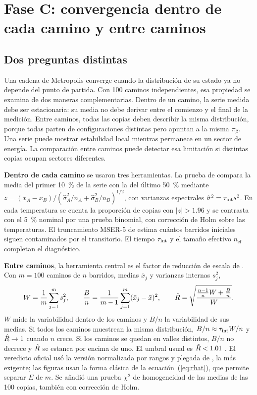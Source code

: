 \section{Fase C: convergencia dentro de cada camino y entre caminos}
\label{sec:convergencia}

\subsection{Dos preguntas distintas}

Una cadena de Metropolis converge cuando la distribución de su estado ya no depende del punto de partida. Con 100 caminos independientes, esa propiedad se examina de dos maneras complementarias. Dentro de un camino, la serie medida debe ser estacionaria: su media no debe derivar entre el comienzo y el final de la medición. Entre caminos, todas las copias deben describir la misma distribución, porque todas parten de configuraciones distintas pero apuntan a la misma $\pi_\beta$. Una serie puede mostrar estabilidad local mientras permanece en un sector de energía. La comparación entre caminos puede detectar esa limitación si distintas copias ocupan sectores diferentes.

\textbf{Dentro de cada camino} se usaron tres herramientas. La prueba de \citet{geweke1992} compara la media del primer 10~\% de la serie con la del último 50~\% mediante $z=(\bar x_A-\bar x_B)/(\hat\sigma_A^2/n_A+\hat\sigma_B^2/n_B)^{1/2}$, con varianzas espectrales $\hat\sigma^2=\tau_{\mathrm{int}} s^2$. En cada temperatura se cuenta la proporción de copias con $|z|>1.96$ y se contrasta con el 5~\% nominal por una prueba binomial, con corrección de Holm sobre las temperaturas. El truncamiento MSER-5 de \citet{white1997} estima cuántos barridos iniciales siguen contaminados por el transitorio. El tiempo $\tau_{\mathrm{int}}$ y el tamaño efectivo $n_{\mathrm{ef}}$ completan el diagnóstico.

\textbf{Entre caminos}, la herramienta central es el factor de reducción de escala de \citet{gelman1992}. Con $m=100$ caminos de $n$ barridos, medias $\bar x_j$ y varianzas internas $s_j^2$,
\begin{equation}
W=\frac1m\sum_{j=1}^m s_j^2,\qquad
\frac{B}{n}=\frac{1}{m-1}\sum_{j=1}^m(\bar x_j-\bar x)^2,\qquad
\hat R=\sqrt{\frac{\frac{n-1}{n}W+\frac{B}{n}}{W}} .
\label{eq:rhat}
\end{equation}
$W$ mide la variabilidad dentro de los caminos y $B/n$ la variabilidad de sus medias. Si todos los caminos muestrean la misma distribución, $B/n\approx\tau_{\mathrm{int}} W/n$ y $\hat R\to1$ cuando $n$ crece. Si los caminos se quedan en valles distintos, $B/n$ no decrece y $\hat R$ se estanca por encima de uno. El umbral usual es $\hat R<1.01$ \citep{vehtari2021}. El veredicto oficial usó la versión normalizada por rangos y plegada de \citet{vehtari2021}, la más exigente; las figuras usan la forma clásica de la ecuación~(\ref{eq:rhat}), que permite separar $E$ de $m$. Se añadió una prueba $\chi^2$ de homogeneidad de las medias de las 100 copias, también con corrección de Holm.


